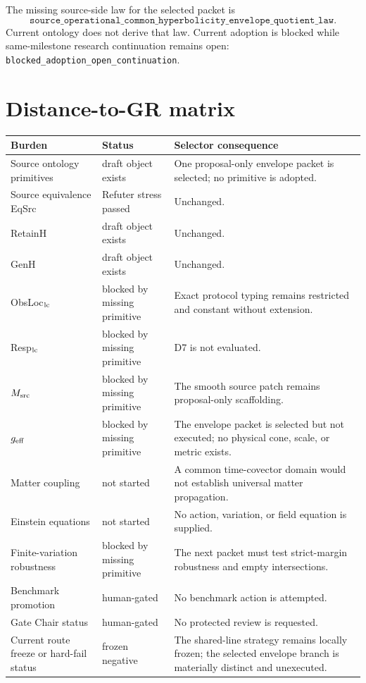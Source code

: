 \documentclass[11pt]{article}
\begin{document}
The missing source-side law for the selected packet is
\[
 \texttt{source\_operational\_common\_hyperbolicity\_envelope\_quotient\_law}.
\]
Current ontology does not derive that law.  Current adoption is blocked while
same-milestone research continuation remains open:
\texttt{blocked\_adoption\_open\_continuation}.

\section{Distance-to-GR matrix}

\begin{longtable}{>{\raggedright\arraybackslash}p{}>{\raggedright\arraybackslash}p{}>{\raggedright\arraybackslash}p{}}
\toprule
Burden & Status & Selector consequence\\
\midrule
Source ontology primitives & draft object exists & One proposal-only envelope packet is selected; no primitive is adopted.\\
Source equivalence EqSrc & Refuter stress passed & Unchanged.\\
RetainH & draft object exists & Unchanged.\\
GenH & draft object exists & Unchanged.\\
ObsLoc\(_{\rm lc}\) & blocked by missing primitive & Exact protocol typing remains restricted and constant without extension.\\
Resp\(_{\rm lc}\) & blocked by missing primitive & D7 is not evaluated.\\
\(M_{\rm src}\) & blocked by missing primitive & The smooth source patch remains proposal-only scaffolding.\\
\(g_{\rm eff}\) & blocked by missing primitive & The envelope packet is selected but not executed; no physical cone, scale, or metric exists.\\
Matter coupling & not started & A common time-covector domain would not establish universal matter propagation.\\
Einstein equations & not started & No action, variation, or field equation is supplied.\\
Finite-variation robustness & blocked by missing primitive & The next packet must test strict-margin robustness and empty intersections.\\
Benchmark promotion & human-gated & No benchmark action is attempted.\\
Gate Chair status & human-gated & No protected review is requested.\\
Current route freeze or hard-fail status & frozen negative & The shared-line strategy remains locally frozen; the selected envelope branch is materially distinct and unexecuted.\\
\bottomrule
\end{longtable}
\end{document}

